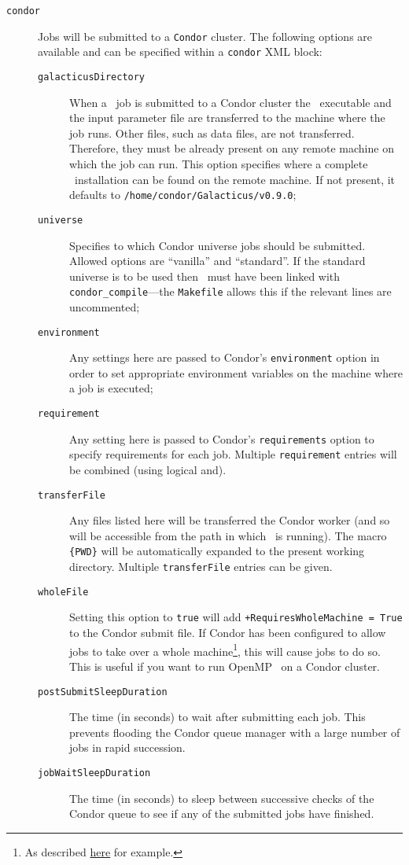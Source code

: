 \begin{description}
\item[{\tt condor}] Jobs will be submitted to a {\tt Condor} cluster. The following options are available and can be specified within a {\tt condor} XML block:
\begin{description}
\item[{\tt galacticusDirectory}] When a \glc\ job is submitted to a {\sc Condor} cluster the \glc\ executable and the input parameter file are transferred to the machine where the job runs. Other files, such as data files, are not transferred. Therefore, they must be already present on any remote machine on which the job can run. This option specifies where a complete \glc\ installation can be found on the remote machine. If not present, it defaults to {\tt /home/condor/Galacticus/v0.9.0};
\item[{\tt universe}] Specifies to which {\sc Condor} universe jobs should be submitted. Allowed options are ``vanilla'' and ``standard''. If the standard universe is to be used then \glc\ must have been linked with {\tt condor\_compile}---the {\tt Makefile} allows this if the relevant lines are uncommented;
\item[{\tt environment}] Any settings here are passed to {\sc Condor}'s {\tt environment} option in order to set appropriate environment variables on the machine where a job is executed;
\item[{\tt requirement}] Any setting here is passed to {\sc Condor}'s {\tt requirements} option to specify requirements for each job. Multiple {\tt requirement} entries will be combined (using logical and).
\item[{\tt transferFile}] Any files listed here will be transferred the Condor worker (and so will be accessible from the path in which \glc\ is running). The macro {\tt \{PWD\}} will be automatically expanded to the present working directory. Multiple {\tt transferFile} entries can be given.
\item [{\tt wholeFile}] Setting this option to {\tt true} will add {\tt +RequiresWholeMachine = True} to the Condor submit file. If Condor has been configured to allow jobs to take over a whole machine\footnote{As described \protect\href{https://www-auth.cs.wisc.edu/lists/condor-users/2009-January/msg00086.shtml}{here} for example.}, this will cause jobs to do so. This is useful if you want to run OpenMP \glc\ on a Condor cluster.
\item[{\tt postSubmitSleepDuration}] The time (in seconds) to wait after submitting each job. This prevents flooding the Condor queue manager with a large number of jobs in rapid succession.
\item[{\tt jobWaitSleepDuration}] The time (in seconds) to sleep between successive checks of the Condor queue to see if any of the submitted jobs have finished.
\end{description}

\end{description}

